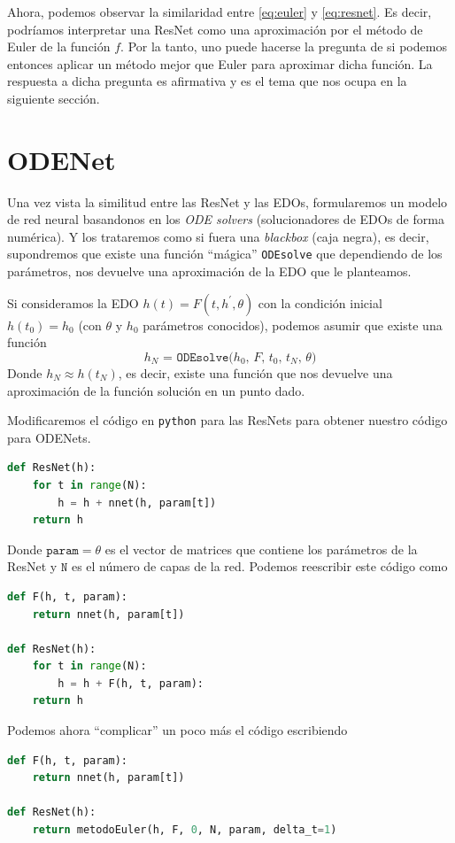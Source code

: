 \documentclass[12pt]{report}
\begin{document}
Ahora, podemos observar la similaridad entre \ref{eq:euler} y \ref{eq:resnet}.
Es decir, podríamos interpretar una ResNet como una aproximación por el método
de Euler de la función $f$. Por la tanto, uno puede hacerse la pregunta de si
podemos entonces aplicar un método mejor que Euler para aproximar dicha función.
La respuesta a dicha pregunta es afirmativa y es el tema que nos ocupa en la
siguiente sección.

\section{ODENet}

Una vez vista la similitud entre las ResNet y las EDOs, formularemos un modelo
de red neural basandonos en los \textit{ODE solvers} (solucionadores de EDOs de
forma numérica). Y los trataremos como si fuera una \textit{blackbox} (caja
negra), es decir, supondremos que existe una función ``mágica'' \texttt{ODEsolve}
que dependiendo de los parámetros, nos devuelve una aproximación de la EDO que
le planteamos.

Si consideramos la EDO $h(t) = F(t, h^\prime, \theta)$ con la condición inicial $h(t_0)
= h_0$ (con $\theta$ y $h_0$ parámetros conocidos), podemos asumir que existe una función
\[
    \texttt{$h_N$ = ODEsolve($h_0$, $F$, $t_0$, $t_N$, $\theta$)}
\]
Donde $h_N \approx h(t_N)$, es decir, existe una función que nos devuelve una
aproximación de la función solución en un punto dado.

Modificaremos el código en \texttt{python} para las ResNets para obtener nuestro
código para ODENets.
\begin{lstlisting}[language=Python]
def ResNet(h):
    for t in range(N):
        h = h + nnet(h, param[t])
    return h
\end{lstlisting}
Donde $\texttt{param} = \theta$ es el vector de matrices que contiene los parámetros de
la ResNet y $\texttt{N}$ es el número de capas de la red. Podemos reescribir este código
como
\begin{lstlisting}[language=Python]
def F(h, t, param):
    return nnet(h, param[t])

def ResNet(h):
    for t in range(N):
        h = h + F(h, t, param):
    return h
\end{lstlisting}
\pagebreak
Podemos ahora ``complicar'' un poco más el código escribiendo
\begin{lstlisting}[language=Python,float=h,floatplacement=H]
def F(h, t, param):
    return nnet(h, param[t])

def ResNet(h):
    return metodoEuler(h, F, 0, N, param, delta_t=1)
\end{lstlisting}
\end{document}
